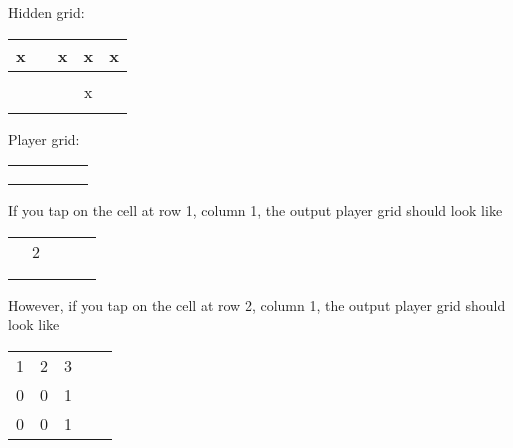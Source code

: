 \documentclass{article}
\begin{document}
\begin{enumerate}[label=(\alph*)]
    
   
    
     \begin{center}
      Hidden grid: \newline
    \begin{tabular}{ | c | c | c | c | c |}
    \hline
      x &  & x & x & x \\
      \hline
       &  &  &  &  \\
      \hline
       &  &  & x &  \\
      \hline
       &  &  &  &  \\
      \hline
    \end{tabular}
    \end{center}

     \begin{center}
     Player grid: \newline
    \begin{tabular}{ | c | c | c | c | c |}
    \hline
       &  &  &  &  \\
      \hline
       &  &  &  &  \\
      \hline
       &  &  &  &  \\
      \hline
       &  &  &  &  \\
      \hline
    \end{tabular}
    \end{center}

    If you tap on the cell at row 1, column 1, the output player grid should look like 

     \begin{center}
    \begin{tabular}{ | c | c | c | c | c |}
    \hline
       &  &  &  &  \\
      \hline
       & 2 &  &  &  \\
      \hline
       &  & &  &  \\
      \hline
       &  &  & &  \\
      \hline
    \end{tabular}
    \end{center}

    However, if you tap on the cell at row 2, column 1, the output player grid should look like 

     \begin{center}
    \begin{tabular}{ | c | c | c | c | c |}
    \hline
       &  &  &  &  \\
      \hline
       1& 2 & 3 &  &  \\
      \hline
       0 &  0 &  1&  &  \\
      \hline
       0 & 0 &  1&  &  \\
      \hline
    \end{tabular}
    \end{center}


\end{enumerate}
\end{document}
